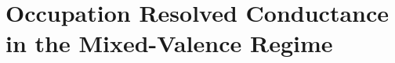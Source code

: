 \chapter{Occupation Resolved Conductance in the Mixed-Valence Regime}\label{cha:mixed_valence_conductance}